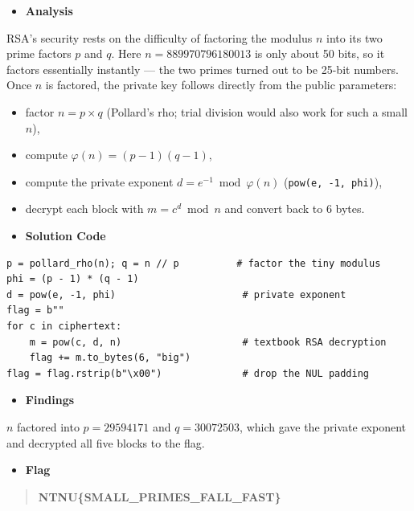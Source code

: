 \documentclass[11pt]{article}
\begin{document}
\begin{itemize}[leftmargin=1.5em]
    \item \textbf{Analysis}
\end{itemize}
\noindent RSA's security rests on the difficulty of factoring the modulus $n$ into its two prime factors $p$ and $q$. Here $n = 889970796180013$ is only about 50 bits, so it factors essentially instantly --- the two primes turned out to be 25-bit numbers. Once $n$ is factored, the private key follows directly from the public parameters:
\begin{itemize}[leftmargin=2.2em]
    \item factor $n = p \times q$ (Pollard's rho; trial division would also work for such a small $n$),
    \item compute $\varphi(n) = (p-1)(q-1)$,
    \item compute the private exponent $d = e^{-1} \bmod \varphi(n)$ (\texttt{pow(e, -1, phi)}),
    \item decrypt each block with $m = c^d \bmod n$ and convert back to 6 bytes.
\end{itemize}

\begin{itemize}[leftmargin=1.5em]
    \item \textbf{Solution Code}
\end{itemize}
\begin{footnotesize}
\begin{verbatim}
p = pollard_rho(n); q = n // p          # factor the tiny modulus
phi = (p - 1) * (q - 1)
d = pow(e, -1, phi)                      # private exponent
flag = b""
for c in ciphertext:
    m = pow(c, d, n)                     # textbook RSA decryption
    flag += m.to_bytes(6, "big")
flag = flag.rstrip(b"\x00")              # drop the NUL padding
\end{verbatim}
\end{footnotesize}

\begin{itemize}[leftmargin=1.5em]
    \item \textbf{Findings}
\end{itemize}
\noindent $n$ factored into $p = 29594171$ and $q = 30072503$, which gave the private exponent and decrypted all five blocks to the flag.

\begin{itemize}[leftmargin=1.5em]
    \item \textbf{Flag}
\end{itemize}
\begin{quote}
\textbf{NTNU\{SMALL\_PRIMES\_FALL\_FAST\}}
\end{quote}
\end{document}
